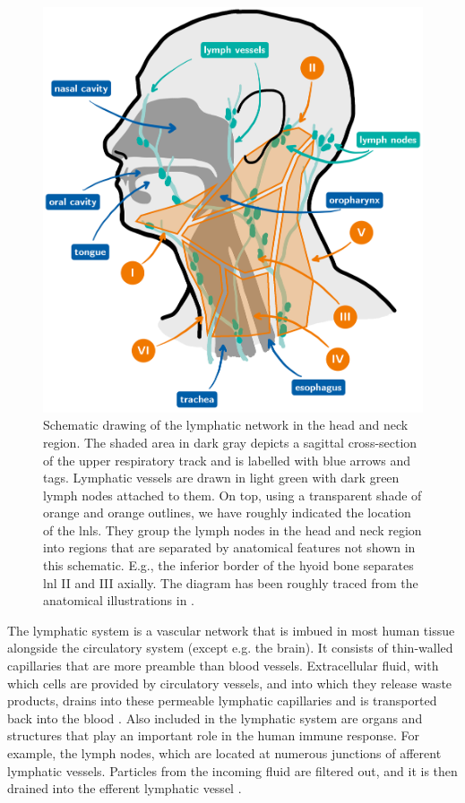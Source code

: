 \documentclass[\relativeRoot/main.tex]{subfiles}
\begin{document}
\begin{figure}
    \centering
    \includegraphics[width=\textwidth]{figures/head_and_neck_labelled.png}
    \caption[
        Schematic drawing of the head and neck region.
    ]{
        Schematic drawing of the lymphatic network in the head and neck region. The shaded area in dark gray depicts a sagittal cross-section of the upper respiratory track and is labelled with blue arrows and tags. Lymphatic vessels are drawn in light green with dark green lymph nodes attached to them. On top, using a transparent shade of orange and orange outlines, we have roughly indicated the location of the \glspl{lnl}. They group the lymph nodes in the head and neck region into regions that are separated by anatomical features not shown in this schematic. E.g., the inferior border of the hyoid bone separates \gls{lnl} II and III axially. The diagram has been roughly traced from the anatomical illustrations in .
    }
    \label{fig:intro:schematics_head}
\end{figure}

The lymphatic system is a vascular network that is imbued in most human tissue alongside the circulatory system (except e.g. the brain). It consists of thin-walled capillaries that are more preamble than blood vessels. Extracellular fluid, with which cells are provided by circulatory vessels, and into which they release waste products, drains into these permeable lymphatic capillaries and is transported back into the blood \cite{wissmann_pathways_2006,oliver_rediscovery_2002}. Also included in the lymphatic system are organs and structures that play an important role in the human immune response. For example, the lymph nodes, which are located at numerous junctions of afferent lymphatic vessels. Particles from the incoming fluid are filtered out, and it is then drained into the efferent lymphatic vessel \cite{willard-mack_normal_2006}.
\end{document}
